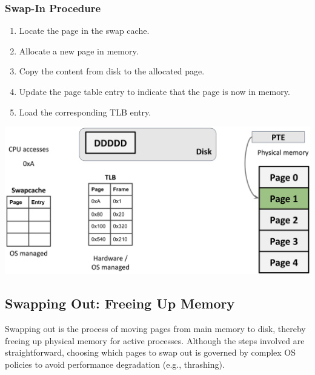 \subsubsection{Swap-In Procedure}
\noindent
\begin{minipage}{0.45\textwidth}
\begin{enumerate}
    \item Locate the page in the swap cache.
    \item Allocate a new page in memory.
    \item Copy the content from disk to the allocated page.
    \item Update the page table entry to indicate that the page is now in memory.
    \item Load the corresponding TLB entry.
\end{enumerate}
\end{minipage}%
\hfill
\begin{minipage}{0.45\textwidth}
\begin{center}
\includegraphics[width=1.1\textwidth]{chapters/L5/images/swapin.png}
\end{center}
\end{minipage}
\newpage
\subsection{Swapping Out: Freeing Up Memory}
Swapping out is the process of moving pages from main memory to disk, thereby freeing up physical memory for active processes. Although the steps involved are straightforward, choosing which pages to swap out is governed by complex OS policies to avoid performance degradation (e.g., thrashing).

